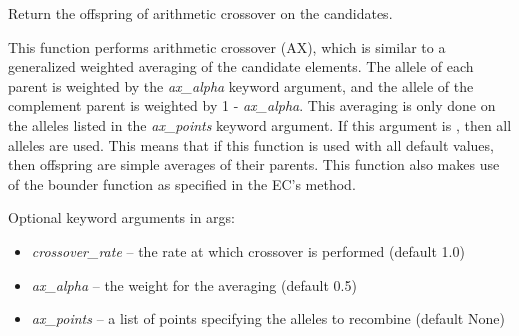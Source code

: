 \documentclass[letterpaper,10pt,english]{sphinxmanual}
\begin{document}

\begin{fulllineitems}
\label{reference:inspyred.ec.variators.arithmetic_crossover}
Return the offspring of arithmetic crossover on the candidates.

This function performs arithmetic crossover (AX), which is similar to a 
generalized weighted averaging of the candidate elements. The allele
of each parent is weighted by the \emph{ax\_alpha} keyword argument, and
the allele of the complement parent is weighted by 1 - \emph{ax\_alpha}.
This averaging is only done on the alleles listed in the \emph{ax\_points}
keyword argument. If this argument is , then all alleles
are used. This means that if this function is used with all default
values, then offspring are simple averages of their parents.
This function also makes use of the bounder function as specified 
in the EC's  method.

Optional keyword arguments in args:
\begin{itemize}
\item {} 
\emph{crossover\_rate} -- the rate at which crossover is performed 
(default 1.0)

\item {} 
\emph{ax\_alpha} -- the weight for the averaging (default 0.5)

\item {} 
\emph{ax\_points} -- a list of points specifying the alleles to
recombine (default None)

\end{itemize}

\end{fulllineitems}

\end{document}
